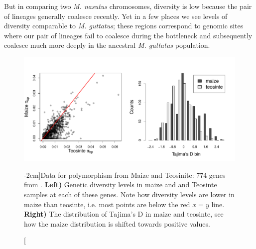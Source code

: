  But in comparing two {\it
  M. nasutus} chromosomes, diversity is low because the pair of lineages generally coalesce
recently. Yet in a few places we see levels of diversity comparable to
{\it M. guttatus}; these regions correspond to genomic sites where our pair of lineages
fail to coalesce during the bottleneck and subsequently coalesce
much more deeply in the ancestral {\it M. guttatus} population.
\begin{figure}
\begin{center}
  \includegraphics[width = \textwidth]{Journal_figs/genetic_drift/Maize_bottleneck/Wright_Tajima_D.pdf}
\end{center}
\caption[][-2cm]{Data for polymorphism from Maize and Teosinite: 774
  genes from \citet{Wright:05}. {\bf Left)} Genetic  diversity levels in maize and and Teosinte samples at each of these genes.
Note how diversity levels are lower in maize than teosinte, i.e. most
points are below the red $x=y$ line. {\bf Right)} The distribution of Tajima's D in maize and teosinte, see how the maize distribution is shifted towards positive values.  } \label{fig:maize_Tajimas_D}  %
\end{figure}

